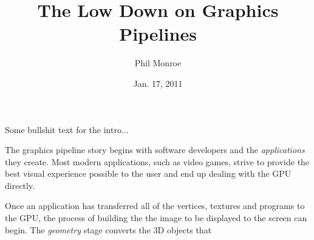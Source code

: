 \documentclass[12pt] {article}
\begin{document}
\title{The Low Down on Graphics Pipelines}
\author{Phil Monroe}
\date{Jan. 17, 2011}
\maketitle

Some bullshit text for the intro...


The graphics pipeline story begins with software developers and the \emph{applications} they create. Most modern applications, such as video games, strive to provide the best visual experience possible to the user and end up dealing with the GPU directly. 


Once an application has transferred all of the vertices, textures and programs to the GPU, the process of building the the image to be displayed to the screen can begin. The \emph{geometry} stage converts the 3D objects that 





\end{document}
